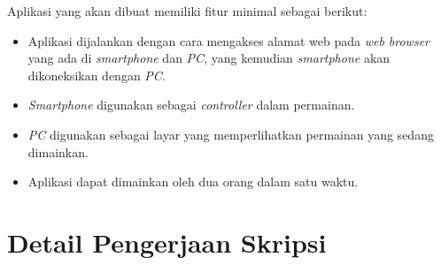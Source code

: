 \documentclass[a4paper,twoside]{article}
\begin{document}
Aplikasi yang akan dibuat memiliki fitur minimal sebagai berikut:
\begin{itemize}
	\item Aplikasi dijalankan dengan cara mengakses alamat web pada \textit{web browser} yang ada di \textit{smartphone} dan \textit{PC}, yang kemudian \textit{smartphone} akan dikoneksikan dengan \textit{PC}.
	\item \textit{Smartphone} digunakan sebagai \textit{controller} dalam permainan.
	\item \textit{PC} digunakan sebagai layar yang memperlihatkan permainan yang sedang dimainkan.
	\item Aplikasi dapat dimainkan oleh dua orang dalam satu waktu.
\end{itemize}

\section{Detail Pengerjaan Skripsi}
\end{document}
